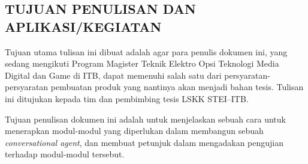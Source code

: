 \subsection*{\textcolor{subsectioncolor}{\textsf{TUJUAN PENULISAN DAN APLIKASI\slash KEGIATAN}}}

Tujuan utama tulisan ini dibuat adalah agar para penulis dokumen ini, yang sedang mengikuti Program Magister Teknik Elektro Opsi Teknologi Media Digital dan Game di ITB, dapat memenuhi salah satu dari persyaratan-persyaratan pembuatan produk yang nantinya akan menjadi bahan tesis.
Tulisan ini ditujukan kepada tim dan pembimbing tesis LSKK STEI--ITB.

Tujuan penulisan dokumen ini adalah untuk menjelaskan sebuah cara untuk menerapkan modul-modul yang diperlukan dalam membangun sebuah \textit{conversational agent},
dan membuat petunjuk dalam mengadakan pengujian terhadap modul-modul tersebut.
